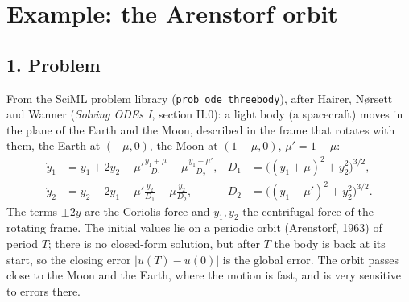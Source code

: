 \documentclass[11pt,a4paper]{article}
\begin{document}
\section*{Example: the Arenstorf orbit}

\subsection*{1. Problem}
From the SciML problem library (\texttt{prob\_ode\_threebody}), after Hairer,
N{\o}rsett and Wanner (\emph{Solving ODEs I}, section II.0): a light body
(a spacecraft) moves in the plane of the Earth and the Moon, described in the
frame that rotates with them, the Earth at $(-\mu, 0)$, the Moon at
$(1 - \mu, 0)$, $\mu' = 1 - \mu$:
\begin{align*}
  \ddot y_1 &= y_1 + 2\dot y_2 - \mu'\frac{y_1 + \mu}{D_1} - \mu\frac{y_1 - \mu'}{D_2}, &
  D_1 &= \bigl((y_1 + \mu)^2 + y_2^2\bigr)^{3/2},\\
  \ddot y_2 &= y_2 - 2\dot y_1 - \mu'\frac{y_2}{D_1} - \mu\frac{y_2}{D_2}, &
  D_2 &= \bigl((y_1 - \mu')^2 + y_2^2\bigr)^{3/2}.
\end{align*}
The terms $\pm 2\dot y$ are the Coriolis force and $y_1, y_2$ the centrifugal
force of the rotating frame. The initial values lie on a periodic orbit
(Arenstorf, 1963) of period $T$; there is no closed-form solution, but after
$T$ the body is back at its start, so the closing error
$|u(T) - u(0)|$ is the global error. The orbit passes close to the Moon and
the Earth, where the motion is fast, and is very sensitive to errors there.
\begin{center}
\small

\end{center}
\end{document}
